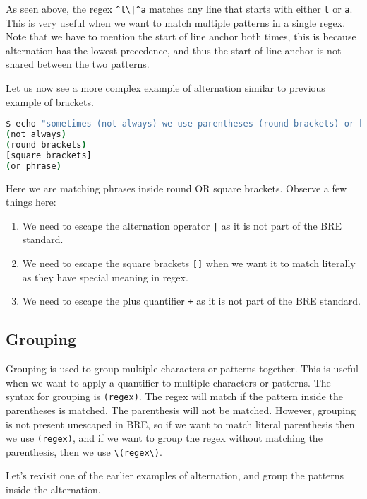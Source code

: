 As seen above, the regex \lstinline:^t\|^a: matches any line that starts with either \lstinline|t| or \lstinline|a|. This is very useful when we want to match multiple patterns in a single regex. Note that we have to mention the start of line anchor both times, this is because
alternation has the lowest precedence, and thus the start of line anchor is not shared between the two patterns.

Let us now see a more complex example of alternation similar to previous example of brackets.

\begin{lstlisting}[language=bash]
$ echo "sometimes (not always) we use parentheses (round brackets) or brackets [square brackets] to clarify some part of a sentence (or phrase)." | grep "([^)]\+)\|\[[^\]\+\]" -o
(not always)
(round brackets)
[square brackets]
(or phrase)
\end{lstlisting}

Here we are matching phrases inside round OR square brackets.
Observe a few things here:

\begin{enumerate}
  \item We need to escape the alternation operator \lstinline:|: as it is not part of the BRE standard.
  \item We need to escape the square brackets \lstinline|[]| when we want it to match literally as they have special meaning in regex.
  \item We need to escape the plus quantifier \lstinline|+| as it is not part of the BRE standard.
\end{enumerate}

\subsection{Grouping}

Grouping is used to group multiple characters or patterns together. This is useful when we want to apply a quantifier to multiple characters or patterns. The syntax for grouping is \lstinline|(regex)|. The regex will match if the pattern inside the parentheses is matched. The parenthesis will not be matched. However, grouping is not present unescaped in BRE, so if we want to match literal parenthesis then we use \lstinline|(regex)|, and if we want to group the regex without matching the parenthesis, then we use \lstinline|\(regex\)|.

Let's revisit one of the earlier examples of alternation, and group the patterns inside the alternation.

